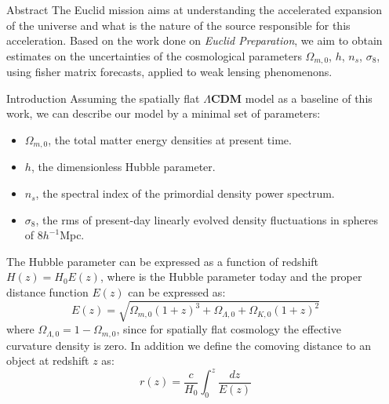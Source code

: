 






\begin{frame}[t] %

\begin{columns}[t] %

\begin{column}{.02\textwidth}\end{column} %

\begin{column}{.465\textwidth} %

\begin{block}{Abstract}
The Euclid mission aims at understanding the accelerated expansion of the universe and what is the nature of the source responsible for this acceleration. Based on the work done on \textit{Euclid Preparation}, we aim to obtain estimates on the uncertainties of the cosmological parameters $\Omega_{m,0}$, $h$, $n_s$, $\sigma_8$, using fisher matrix forecasts, applied to weak lensing phenomenons.

\end{block}

\begin{block}{Introduction}
	Assuming the spatially flat $\Lambda$\textbf{CDM} model as a baseline of this work, we can describe our model by a minimal set of parameters:
\begin{itemize}
    \item $\Omega_{m,0}$, the total matter energy densities at present time.
    \item $h$, the dimensionless Hubble parameter.
    \item $n_s$, the spectral index of the primordial density power spectrum.
    \item $\sigma_8$, the rms of present-day linearly evolved density fluctuations in spheres of $8h^{-1}$Mpc.
\end{itemize}
The Hubble parameter can be expressed as a function of redshift $H(z) = H_0 E(z)$, where is the Hubble parameter today and the proper distance function $E(z)$ can be expressed as:
$$ E(z) = \sqrt{\Omega_{m,0}(1+z)^3 +\Omega_{\Lambda,0}+ \Omega_{K,0}(1+z)^2}$$
where $\Omega_{\Lambda,0}=1-\Omega_{m,0}$, since for spatially flat cosmology the effective curvature density is zero. In addition we define the comoving distance to an object at redshift $z$ as:
$$r(z) = \frac{c}{H_0}\int_{0}^{z} \frac{dz}{E(z)}$$


\end{block}
\end{column}
\end{columns}
\end{frame}
